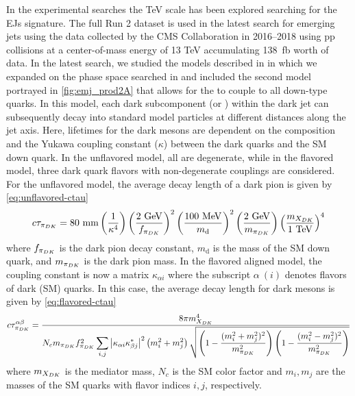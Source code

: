 In the experimental searches \cite{sirunyan2019search,CMS:2024gxp} the TeV scale has been explored searching for the EJs signature.
The full Run 2 dataset is used in the latest search for emerging jets using the data collected by the CMS Collaboration in 2016--2018 using pp collisions at a center-of-mass energy of 13 TeV accumulating 138\unit{\per\femto\barn} worth of data\cite{CMS:2024gxp}.
In the latest search, we studied the models described in \cite{Bai_2014,Schwaller:2015gea,Renner_2018} in which we expanded on the phase space searched in \cite{sirunyan2019search} and included the second model portrayed in \cref{fig:emj_prod2A} that allows for the \Qdark to couple to all down-type quarks. In this model, each dark subcomponent (or \pidark) within the dark jet can subsequently decay into standard model particles at different distances along the jet axis.
Here, lifetimes for the dark mesons are dependent on the \Qdark composition and the Yukawa coupling constant ($\kappa$) between the dark quarks and the SM down quark.
In the unflavored model, all \Qdark are degenerate, while in the flavored model, three dark quark flavors with non-degenerate couplings are considered.
For the unflavored model, the average decay length of a dark pion is given by \cref{eq:unflavored-ctau}
\begin{equation}
	\ctaudpi = 80~\unit{mm} \pgroup{\frac{1}{\kappa^4}} \pgroup{\frac{2 ~\unit{GeV} }{f_{\pidark}}}^2 \pgroup{\frac{100 ~\unit{MeV}}{m_\text{d}} }^2 \pgroup{\frac{2~\unit{GeV}}{m_{\pidark}}} \pgroup{\frac{m_{\Mdark}}{1~\unit{TeV}}}^4
	\label{eq:unflavored-ctau}
\end{equation}
where $f_{\pi_{DK}}$ is the dark pion decay constant, $m_\text{d}$ is the mass of the SM down quark, and $m_{\pi_{DK}}$ is the dark pion mass. In the flavored aligned model, the coupling constant is now a matrix $\kappa_{\alpha i}$ where the subscript $\alpha ~(i)$ denotes flavors of dark (SM) quarks. In this case, the average decay length for dark mesons is given by \cref{eq:flavored-ctau}
\begin{equation}
	\small
	c\tau_{\pi_{DK}}^{\alpha \beta} = \dfrac{8\pi m^4_{X_{DK}}}{ N_c m_{\pi_{DK}} f^2_{\pi_{DK}} \displaystyle \sum_{i,j} \abs{\kappa_{\alpha i} \kappa_{\beta j}^*}^2 \left(m_i^2 + m_j^2\right) \sqrt{ \left(1- \dfrac{(m_i^2 + m_j^2)^2 }{m^2_{\pi_{DK}}} \right) \left(1- \dfrac{(m_i^2 - m_j^2)^2 }{m^2_{\pi_{DK}}} \right) } }
	\label{eq:flavored-ctau}
\end{equation}
where $m_{X_{DK}}$ is the mediator mass, $N_c$ is the SM color factor and $m_i, m_j$ are the masses of the SM quarks with flavor indices $i, j$, respectively\cite{CMS:2024gxp}.
